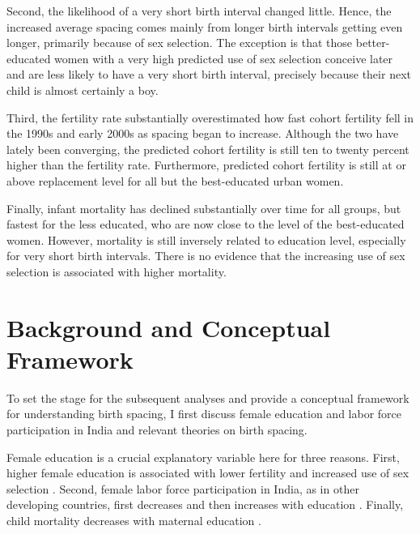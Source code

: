 \documentclass[12pt,letterpaper]{article}
\begin{document}
Second, the likelihood of a very short birth interval changed little. 
Hence, the increased average spacing comes mainly from longer birth intervals getting even 
longer, primarily because of sex selection. 
The exception is that those better-educated women with a very high predicted use of sex 
selection conceive later and are less likely to have a very short birth interval, precisely 
because their next child is almost certainly a boy. 

Third, the fertility rate substantially overestimated how fast cohort fertility fell in the 
1990s and early 2000s as spacing began to increase. 
Although the two have lately been converging, the predicted cohort fertility is still ten to 
twenty percent higher than the fertility rate. 
Furthermore, predicted cohort fertility is still at or above replacement level for all but 
the best-educated urban women. 

Finally, infant mortality has declined substantially over time for all groups, but fastest 
for the less educated, who are now close to the level of the best-educated women. 
However, mortality is still inversely related to education level, especially for very short 
birth intervals. 
There is no evidence that the increasing use of sex selection is associated with higher mortality.




\section{Background and Conceptual Framework}

To set the stage for the subsequent analyses and provide a conceptual framework for 
understanding birth spacing, I first discuss female education and labor force 
participation in India and relevant theories on birth spacing.


Female education is a crucial explanatory variable here for three reasons.
First, higher female education is associated with lower fertility and increased use of 
sex selection
\citep{das_gupta97,dreze01,bhat03,retherford03b,Guilmoto2009a,Portner2015b,Jayachandran2017}.
Second, female labor force participation in India, as in other developing countries, 
first decreases and then increases with education
\citep{Klasen2015,Fletcher2017,Afridi2018,Bhargava2018,Chatterjee2018,Bhargava2019}.
Finally, child mortality decreases with maternal education
\citep{Rosenzweig1982a,Whitworth2002,Maitra2008}.
\end{document}
